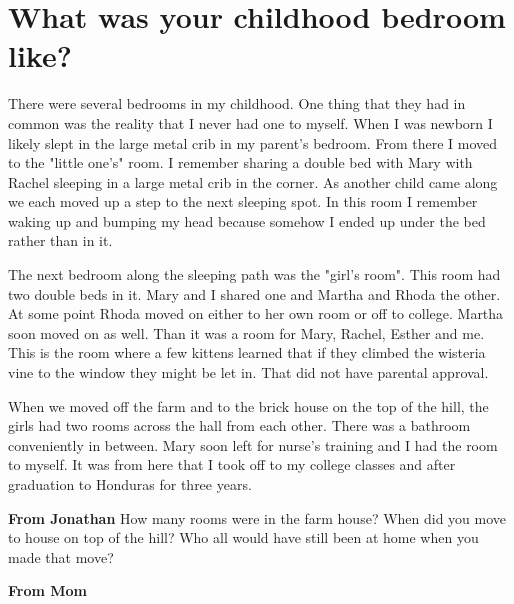 \section{What was your childhood bedroom like?}
There were several bedrooms in my childhood.
One thing that they had in common was the reality that I never had one to myself.
When I was newborn I likely slept in the large metal crib in my parent's bedroom.
From there I moved to the "little one's" room.
I remember sharing a double bed with Mary with Rachel sleeping in a large metal crib in the corner.
As another child came along we each moved up a step to the next sleeping spot.
In this room I remember waking up and bumping my head because somehow I ended up under the bed rather than in it.

The next bedroom along the sleeping path was the "girl's room".
This room had two double beds in it.
Mary and I shared one and Martha and Rhoda the other.
At some point Rhoda moved on either to her own room or off to college.
Martha soon moved on as well.
Than it was a room for Mary, Rachel, Esther and me.
This is the room where a few kittens learned that if they climbed the wisteria vine to the window they might be let in.
That did not have parental approval.

When we moved off the farm and to the brick house on the top of the hill, the girls had two rooms across the hall from each other.
There was a bathroom conveniently in between.
Mary soon left for nurse's training and I had the room to myself.
It was from here that I took off to my college classes and after graduation to Honduras for three years.


\textbf{From Jonathan} How many rooms were in the farm house?
When did you move to house on top of the hill?  Who all would have still been at home when you made that move?


\textbf{From Mom}